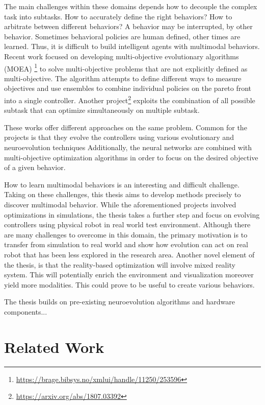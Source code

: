 \documentclass[format=acmsmall, review=false, screen=true]{acmart}
\begin{document}
The main challenges within these domains depends how to decouple the complex task into subtasks. How to accurately define the right behaviors? How to arbitrate between different behaviors? A behavior may be interrupted, by other behavior. Sometimes behavioral policies are human defined, other times are learned. Thus, it is difficult to build intelligent agents with multimodal behaviors. Recent work focused on developing multi-objective evolutionary algorithms (MOEA) \footnote{\url{https://brage.bibsys.no/xmlui/handle/11250/253596}} to solve multi-objective problems that are not explicitly defined as multi-objective. The algorithm attempts to define different ways to measure objectives and use ensembles to combine individual policies on the pareto front into a single controller. Another project\footnote{\url{https://arxiv.org/abs/1807.03392}} exploits the combination of all possible subtask that can optimize simultaneously on multiple subtask. 

These works offer different approaches on the same problem. Common for the projects is that they evolve the controllers using various evolutionary and neuroevolution techniques Additionally, the neural networks are combined with multi-objective optimization algorithms in order to focus on the desired objective of a given behavior.

How to learn multimodal behaviors is an interesting and difficult challenge. Taking on these challenges, this thesis aims to develop methods precisely to discover multimodal behavior. While the aforementioned projects involved optimizations in simulations, the thesis takes a further step and focus on evolving controllers using physical robot in real world test environment. Although there are many challenges to overcome in this domain, the primary motivation is to transfer from simulation to real world and show how evolution can act on real robot that has been less explored in the research area. Another novel element of the thesis, is that the reality-based optimization will involve mixed reality system. This will potentially enrich the environment and visualization moreover yield more modalities. This could prove to be useful to create various behaviors.


The thesis builds on pre-existing neuroevolution algorithms and hardware components...

\section{Related Work}
\end{document}
